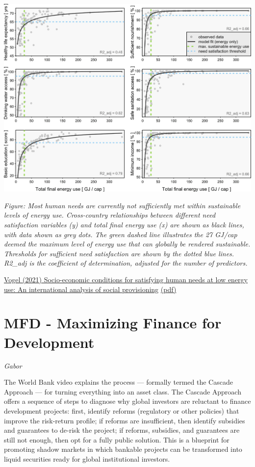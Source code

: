 \documentclass[
]{book}
\begin{document}
\includegraphics{fig/Vogel_fig2.jpg}

\emph{Figure: Most human needs are currently not sufficiently met within sustainable levels of energy use. Cross-country relationships between different need satisfaction
variables (y) and total final energy use (x) are shown as black lines, with data shown as grey dots. The green dashed line illustrates the 27 GJ/cap deemed the
maximum level of energy use that can globally be rendered sustainable. Thresholds for sufficient need satisfaction are shown by the dotted blue
lines. R2\_adj is the coefficient of determination, adjusted for the number of predictors.}

\href{https://www.sciencedirect.com/science/article/pii/S0959378021000662}{Vogel (2021) Socio-economic conditions for satisfying human needs at low energy use: An international analysis of social provisioning}
\href{pdf/Vogel_2021_Social_Provisoning_of_Needs.pdf}{(pdf)}

\hypertarget{mfd---maximizing-finance-for-development}{%
\section{MFD - Maximizing Finance for Development}\label{mfd---maximizing-finance-for-development}}

\emph{Gabor}

The World Bank video explains the process --- formally termed the Cascade Approach --- for turning everything into an asset class. The Cascade Approach offers a sequence of steps to diagnose why global investors are reluctant to finance development projects: first, identify reforms (regulatory or other policies) that improve the risk-return profile; if reforms are insufficient, then identify subsidies and guarantees to de-risk the project; if reforms, subsidies, and guarantees are still not enough, then opt for a fully public solution. This is a blueprint for promoting shadow markets in which bankable projects can be transformed into liquid securities ready for global institutional investors.
\end{document}
